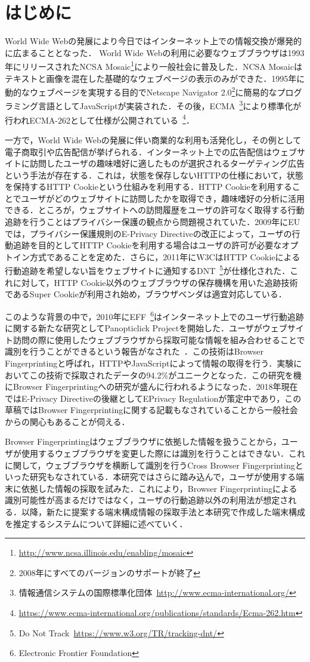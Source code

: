 \section{はじめに}
World Wide Webの発展により今日ではインターネット上での情報交換が爆発的に広まることとなった． World Wide Webの利用に必要なウェブブラウザは1993年にリリースされたNCSA Mosaic\footnote{\url{http://www.ncsa.illinois.edu/enabling/mosaic}}により一般社会に普及した．NCSA Mosaicはテキストと画像を混在した基礎的なウェブページの表示のみができた．1995年に動的なウェブページを実現する目的でNetscape Navigator 2.0\footnote{2008年にすべてのバージョンのサポートが終了}に簡易的なプログラミング言語としてJavaScriptが実装された．その後，ECMA~\footnote{情報通信システムの国際標準化団体~\url{http://www.ecma-international.org/}}により標準化が行われECMA-262として仕様が公開されている~\footnote{\url{https://www.ecma-international.org/publications/standards/Ecma-262.htm}}．

一方で，World Wide Webの発展に伴い商業的な利用も活発化し，その例として電子商取引や広告配信が挙げられる．インターネット上での広告配信はウェブサイトに訪問したユーザの趣味嗜好に適したものが選択されるターゲティング広告という手法が存在する．これは，状態を保存しないHTTPの仕様において，状態を保持するHTTP Cookieという仕組みを利用する．HTTP Cookieを利用することでユーザがどのウェブサイトに訪問したかを取得でき，趣味嗜好の分析に活用できる．ところが，ウェブサイトへの訪問履歴をユーザの許可なく取得する行動追跡を行うことはプライバシー保護の観点から問題視されていた．2009年にEUでは，プライバシー保護規則のE-Privacy Directiveの改正によって，ユーザの行動追跡を目的としてHTTP Cookieを利用する場合はユーザの許可が必要なオプトイン方式であることを定めた．さらに，2011年にW3CはHTTP Cookieによる行動追跡を希望しない旨をウェブサイトに通知するDNT~\footnote{Do Not Track~\url{https://www.w3.org/TR/tracking-dnt/}}が仕様化された．これに対して，HTTP Cookie以外のウェブブラウザの保存機構を用いた追跡技術であるSuper Cookieが利用され始め，ブラウザベンダは適宜対応している． 

このような背景の中で，2010年にEFF~\footnote{Electronic Frontier Foundation}はインターネット上でのユーザ行動追跡に関する新たな研究としてPanopticlick Projectを開始した．ユーザがウェブサイト訪問の際に使用したウェブブラウザから採取可能な情報を組み合わせることで識別を行うことができるという報告がなされた~\cite{eckersley2010unique}．この技術はBrowser Fingerprintingと呼ばれ，HTTPやJavaScriptによって情報の取得を行う．実験においてこの技術で採取されたデータの94.2\%がユニークとなった．この研究を機にBrowser Fingerprintingへの研究が盛んに行われるようになった．2018年現在ではE-Privacy Directiveの後継としてEPrivacy Regulationが策定中であり，この草稿ではBrowser Fingerprintingに関する記載もなされていることから一般社会からの関心もあることが伺える．

Browser Fingerprintingはウェブブラウザに依拠した情報を扱うことから，ユーザが使用するウェブブラウザを変更した際には識別を行うことはできない．これに関して，ウェブブラウザを横断して識別を行うCross Browser Fingerprintingといった研究もなされている．本研究ではさらに踏み込んで，ユーザが使用する端末に依拠した情報の採取を試みた．これにより，Browser Fingerprintingによる識別可能性が高まるだけではなく，ユーザの行動追跡以外の利用法が想定される．以降，新たに提案する端末構成情報の採取手法と本研究で作成した端末構成を推定するシステムについて詳細に述べていく．
